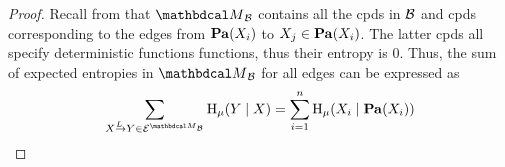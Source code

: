\begin{proof}
% 
% 
Recall from 
that $\PDGof{\cal B}$ contains all
the cpds in ${\cal B}$  and cpds corresponding to the edges from
$\mathbf{Pa}(X_i)$ to $X_j \in \mathbf{Pa}(X_i)$.  The latter cpds
all specify deterministic functions
functions, thus their entropy is 0.
Thus, the sum of
expected entropies in $\PDGof{\cal B}$ for all edges can be
expressed as 
\begin{equation}\label{eq:fact2}
\sum_{\ed LXY \in \Ed^{\PDGof{\mathcal B}}} \H_\mu(Y\mid X)=\sum_{i=1}^n \H_\mu(X_i \mid \Pa(X_i))
\end{equation}
% 

\end{proof}
